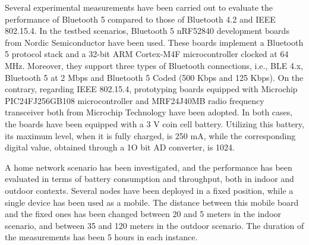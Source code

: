 \documentclass[12pt, draftclsnofoot, onecolumn]{IEEEtran}
\begin{document}
Several experimental measurements have been carried out to evaluate the performance of Bluetooth 5 compared to those of Bluetooth 4.2 and IEEE 802.15.4. In the testbed scenarios, Bluetooth 5 nRF52840 development boards \cite{nordic} from Nordic Semiconductor have been used. These boards implement a Bluetooth 5 protocol stack and a 32-bit ARM Cortex-M4F microcontroller clocked at 64 MHz. Moreover, they support three types of Bluetooth connections, i.e., BLE 4.x, Bluetooth 5 at 2 Mbps and Bluetooth 5 Coded (500 Kbps and 125 Kbps). On the contrary, regarding IEEE 802.15.4, prototyping boards equipped with Microchip PIC24FJ256GB108 microcontroller \cite{PIC24F} and MRF24J40MB radio frequency transceiver \cite{MRF24J40MB} both from Microchip Technology have been adopted. In both cases, the boards have been equipped with a 3 V coin cell battery. Utilizing this battery, its maximum level, when it is fully charged, is 250 mA, while the corresponding digital value, obtained through a 1O bit AD converter, is 1024.

A home network scenario has been investigated, and the performance has been evaluated in terms of battery consumption and throughput, both in indoor and outdoor contexts. Several nodes have been deployed in a fixed position, while a single device has been used as a mobile. The distance between this mobile board and the fixed ones has been changed between 20 and 5 meters in the indoor scenario, and between 35 and 120 meters in the outdoor scenario. The duration of the measurements has been 5 hours in each instance.
\end{document}
